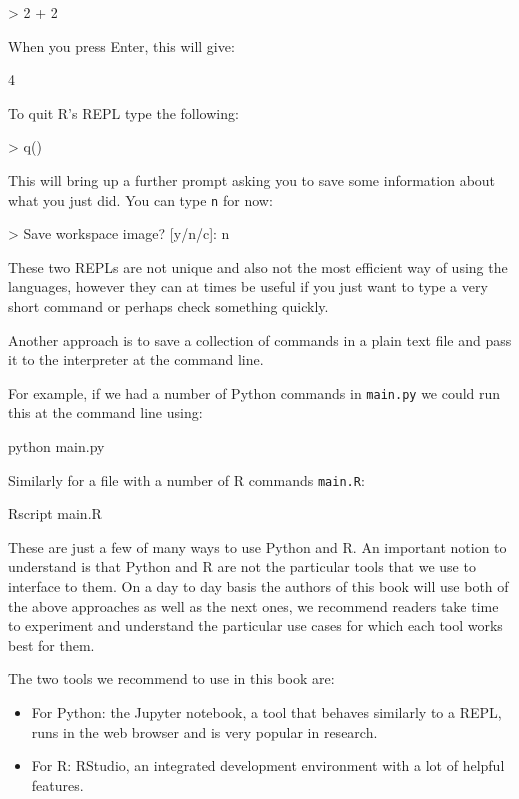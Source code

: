 \begin{Rin} %
> 2 + 2
\end{Rin}

When you press Enter, this will give:

\begin{Rout} %
4
\end{Rout}

To quit R's REPL type the following:

\begin{Rin} %
> q()
\end{Rin}

This will bring up a further prompt asking you to save some information about
what you just did. You can type \texttt{n} for now:

\begin{Rin} %
> Save workspace image? [y/n/c]: n
\end{Rin}

These two REPLs are not unique and also not the most efficient way of using the
languages, however they can at times be useful if you just want to type a very
short command or perhaps check something quickly.

Another approach is to save a collection of commands in a plain text file and
pass it to the interpreter at the command line.

For example, if we had a number of Python commands in \texttt{main.py}
we could run this at the command line using:

\begin{cliin}
python main.py
\end{cliin}

Similarly for a file with a number of R commands \texttt{main.R}:

\begin{cliin}
Rscript main.R
\end{cliin}

These are just a few of many ways to use Python and R. An important notion to
understand is that Python and R are not the particular tools that we use to
interface to them. On a day to day basis the authors of this book will use both
of the above approaches as well as the next ones, we recommend readers take time
to experiment and understand the particular use cases for which each tool works
best for them.

The two tools we recommend to use in this book are:

\begin{itemize}
    \item For Python: the Jupyter notebook, a tool that behaves similarly to a
        REPL, runs in the web browser and is very popular in research.
    \item For R: RStudio, an integrated development environment with a lot of
        helpful features.
\end{itemize}

